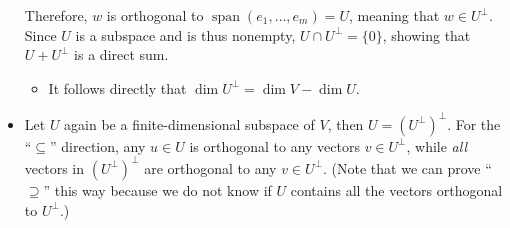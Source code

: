 \documentclass{article}
\newcommand{\s}{\operatorname{span}}
\renewcommand{\d}{\dim}
\begin{document}
\begin{itemize}
    Therefore, $w$ is orthogonal to $\s(e_1,\dots,e_m) = U$, meaning that $w \in U^\perp$. Since $U$ is a subspace and is thus nonempty, $U \cap U^\perp = \{0\}$, showing that $U + U^\perp$ is a direct sum.
    \begin{itemize}
        \item It follows directly that $\d U^\perp = \d V - \d U$.
    \end{itemize}
    \item Let $U$ again be a finite-dimensional subspace of $V$, then $U=(U^\perp)^\perp$. For the ``$\subseteq$'' direction, any $u \in U$ is orthogonal to any vectors $v \in U^\perp$, while \emph{all} vectors in $(U^\perp)^\perp$ are orthogonal to any $v \in U^\perp$. (Note that we can prove ``$\supseteq$'' this way because we do not know if $U$ contains all the vectors orthogonal to $U^\perp$.)
    

\end{itemize}
\end{document}
